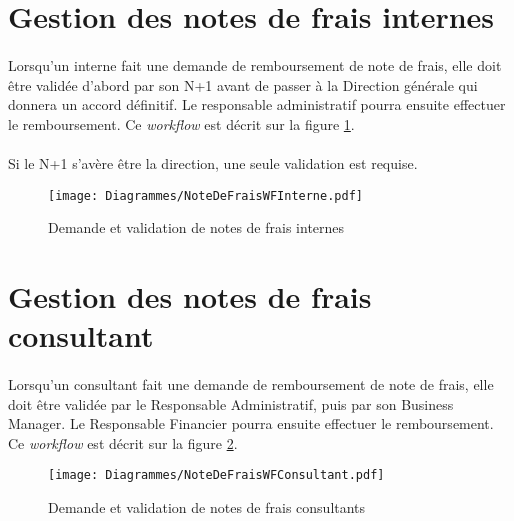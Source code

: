 \section{Gestion des notes de frais internes}

\paragraph{} Lorsqu'un interne fait une demande de remboursement de note de frais, elle doit être validée d'abord par son N+1 avant de passer à la Direction générale qui donnera un accord définitif. Le responsable administratif pourra ensuite effectuer le remboursement. Ce \textit{workflow} est décrit sur la figure \ref{ndfI}.
\paragraph{} Si le N+1 s'avère être la direction, une seule validation est requise.


\begin{figure}[H]
	\centering
	\texttt{[image: Diagrammes/NoteDeFraisWFInterne.pdf]}
	\caption{Demande et validation de notes de frais internes} 
	\label{ndfI}
\end{figure}

\section{Gestion des notes de frais consultant}

\paragraph{} Lorsqu'un consultant fait une demande de remboursement de note de frais, elle doit être validée par le Responsable Administratif, puis par son Business Manager. Le Responsable Financier pourra ensuite effectuer le remboursement. Ce \textit{workflow} est décrit sur la figure \ref{ndfC}.

\begin{figure}[H]
	\centering
	\texttt{[image: Diagrammes/NoteDeFraisWFConsultant.pdf]}
	\caption{Demande et validation de notes de frais consultants}
	\label{ndfC}
\end{figure}
